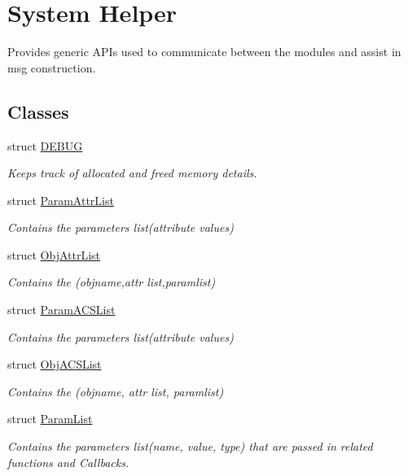 \hypertarget{group__LIBHELP}{\section{System Helper}
\label{group__LIBHELP}
}


Provides generic A\-P\-Is used to communicate between the modules and assist in msg construction.  


\subsection*{Classes}
\begin{DoxyCompactItemize}
\item 
struct \hyperlink{structDEBUG}{D\-E\-B\-U\-G}
\begin{DoxyCompactList}\small\item\em Keeps track of allocated and freed memory details. \end{DoxyCompactList}\item 
struct \hyperlink{structParamAttrList}{Param\-Attr\-List}
\begin{DoxyCompactList}\small\item\em Contains the parameters list(attribute values) \end{DoxyCompactList}\item 
struct \hyperlink{structObjAttrList}{Obj\-Attr\-List}
\begin{DoxyCompactList}\small\item\em Contains the (objname,attr list,paramlist) \end{DoxyCompactList}\item 
struct \hyperlink{structParamACSList}{Param\-A\-C\-S\-List}
\begin{DoxyCompactList}\small\item\em Contains the parameters list(attribute values) \end{DoxyCompactList}\item 
struct \hyperlink{structObjACSList}{Obj\-A\-C\-S\-List}
\begin{DoxyCompactList}\small\item\em Contains the (objname, attr list, paramlist) \end{DoxyCompactList}\item 
struct \hyperlink{structParamList}{Param\-List}
\begin{DoxyCompactList}\small\item\em Contains the parameters list(name, value, type) that are passed in related functions and Callbacks. \end{DoxyCompactList}\item 

\end{DoxyCompactItemize}
